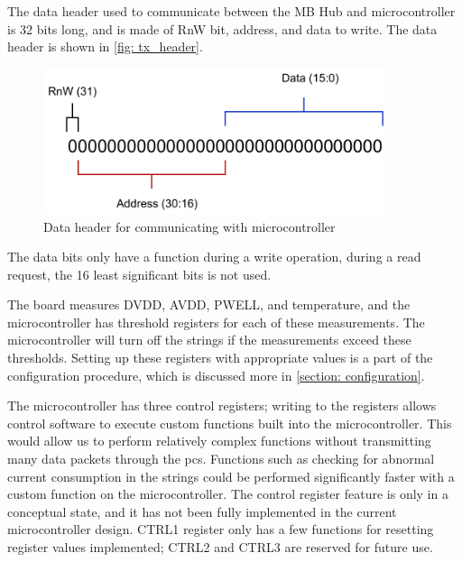 \documentclass[main.tex]{subfiles}
\begin{document}
The data header used to communicate between the MB Hub and microcontroller is 32 bits long, and is made of RnW bit, address, and data to write. The data header is shown in \autoref{fig: tx_header}.

\begin{figure}[!htpb]
    \centering
    \includegraphics[width=10cm, scale=1]{images/TX packet header.pdf}
    \caption{Data header for communicating with microcontroller}
    \label{fig: tx_header}
\end{figure}
\FloatBarrier

The data bits only have a function during a write operation, during a read request, the 16 least significant bits is not used.

The board measures DVDD, AVDD, PWELL, and temperature, and the microcontroller has threshold registers for each of these measurements. The microcontroller will turn off the strings if the measurements exceed these thresholds. Setting up these registers with appropriate values is a part of the configuration procedure, which is discussed more in \autoref{section: configuration}.

The microcontroller has three control registers; writing to the registers allows control software to execute custom functions built into the microcontroller. This would allow us to perform relatively complex functions without transmitting many data packets through the \gls{pcs}. Functions such as checking for abnormal current consumption in the strings could be performed significantly faster with a custom function on the microcontroller. The control register feature is only in a conceptual state, and it has not been fully implemented in the current microcontroller design. CTRL1 register only has a few functions for resetting register values implemented; CTRL2 and CTRL3 are reserved for future use.


\end{document}
